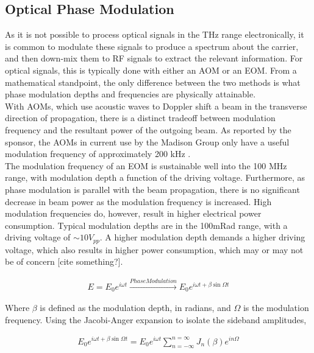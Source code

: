 \subsection{Optical Phase Modulation}

As it is not possible to process optical signals in the THz range electronically,
it is common to modulate these signals to produce a spectrum about the carrier,
and then down-mix them to RF signals to extract the relevant information.
For optical signals, this is typically done with either an AOM or an EOM. From
a mathematical standpoint, the only difference between the two methods is
what phase modulation depths and frequencies are physically attainable. \\

With AOMs, which use acoustic waves to Doppler shift a beam in the transverse
direction of propagation, there is a distinct tradeoff between modulation
frequency and the resultant power of the outgoing beam. As reported by the
sponsor, the AOMs in current use by the Madison Group only have a useful
modulation frequency of approximately 200 kHz \cite{madison14}. \\

The modulation frequency of an EOM is sustainable well into the 100 MHz range,
with modulation depth a function of the driving voltage. Furthermore, as
phase modulation is parallel with the beam propagation, there is no significant
decrease in beam power as the modulation frequency is increased. High modulation
frequencies do, however, result in higher electrical power consumption.
Typical modulation depths are in the 100mRad range, with a driving voltage of
$\sim 10 V_{pp}$. A higher modulation depth demands a higher driving voltage,
which also results in higher power consumption, which may or may not be of
concern [cite something?].

\begin{gather}
  E = E_0 e^{i\omega t} \xrightarrow{Phase Modulation}
    E_0 e^{i \omega t + \beta \sin \Omega t}
\end{gather}

Where $\beta$ is defined as the modulation depth, in radians, and $\Omega$ is the
modulation frequency. Using the Jacobi-Anger expansion to isolate the sideband
amplitudes,

\begin{gather}
  E_0 e^{i \omega t + \beta \sin \Omega t}  =
  E_0 e^{i\omega t} \sum_{n = -\infty}^{n = \infty} J_n(\beta)e^{in\Omega}
\end{gather}

